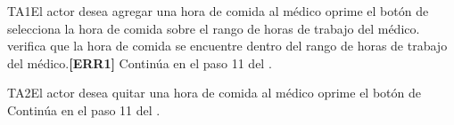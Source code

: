 \begin{UCtrayectoriaA}{TA1}{El actor desea agregar una hora de comida al médico}			
			\UCpaso[\UCactor] oprime el botón  de 
      \UCpaso[\UCactor] selecciona la hora de comida sobre el rango de horas de trabajo del médico.
      \UCpaso verifica que la hora de comida se encuentre dentro del rango de horas de trabajo del médico.\textbf{[ERR1]}
      \UCpaso Continúa en el paso 11 del .
\end{UCtrayectoriaA}

\begin{UCtrayectoriaA}{TA2}{El actor desea quitar una hora de comida al médico}			
			\UCpaso[\UCactor] oprime el botón  de             
      \UCpaso Continúa en el paso 11 del .
\end{UCtrayectoriaA}